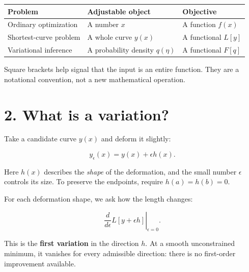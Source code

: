 \documentclass[
  letterpaper,
  DIV=11,
  numbers=noendperiod]{scrreprt}
\newcounter{none} %
\begin{document}
{\def\LTcaptype{none} %
\begin{longtable}[]{@{}
  >{\raggedright\arraybackslash}p{}
  >{\raggedright\arraybackslash}p{}
  >{\raggedright\arraybackslash}p{}@{}}
\toprule\noalign{}
\begin{minipage}[b]{\linewidth}\raggedright
Problem
\end{minipage} & \begin{minipage}[b]{\linewidth}\raggedright
Adjustable object
\end{minipage} & \begin{minipage}[b]{\linewidth}\raggedright
Objective
\end{minipage} \\
\midrule\noalign{}
\endhead
\bottomrule\noalign{}
\endlastfoot
Ordinary optimization & A number \(x\) & A function \(f(x)\) \\
Shortest-curve problem & A whole curve \(y(x)\) & A functional
\(L[y]\) \\
Variational inference & A probability density \(q(\eta)\) & A functional
\(F[q]\) \\
\end{longtable}
}

Square brackets help signal that the input is an entire function. They
are a notational convention, not a new mathematical operation.

\section{2. What is a variation?}\label{what-is-a-variation}

Take a candidate curve \(y(x)\) and deform it slightly:

\[
y_\epsilon(x)=y(x)+\epsilon h(x).
\]

Here \(h(x)\) describes the \emph{shape} of the deformation, and the
small number \(\epsilon\) controls its size. To preserve the endpoints,
require \(h(a)=h(b)=0\).

For each deformation shape, we ask how the length changes:

\[
\left.\frac{d}{d\epsilon}L[y+\epsilon h]\right|_{\epsilon=0}.
\]

This is the \textbf{first variation} in the direction \(h\). At a smooth
unconstrained minimum, it vanishes for every admissible direction: there
is no first-order improvement available.
\end{document}

